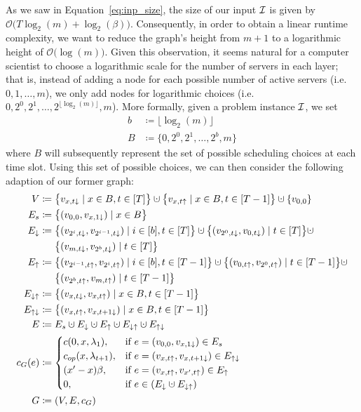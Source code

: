 As we saw in Equation~\eqref{eq:inp_size}, the size of our input $\mathcal{I}$ is given by $\mathcal{O}\bigl(T\log_2(m)+\log_2(\beta)\bigr)$. Consequently, in order to obtain a linear runtime complexity, we want to reduce the graph's height from $m+1$ to a logarithmic height of $\mathcal{O}\bigl(\log(m)\bigr)$. Given this observation, it seems natural for a computer scientist to choose a logarithmic scale for the number of servers in each layer; that is, instead of adding a node for each possible number of active servers (i.e.\ $0,1,\ldots,m$), we only add nodes for logarithmic choices (i.e.\ $0,2^0,2^1,\ldots,2^{\lfloor\log_2(m)\rfloor},m$). More formally, given a problem instance $\mathcal{I}$, we set
\begin{align*}
	b&\coloneqq\lfloor\log_2(m)\rfloor\\
	B&\coloneqq\{0,2^0,2^1,\ldots,2^b,m\}
\end{align*}
where $B$ will subsequently represent the set of possible scheduling choices at each time slot. Using this set of possible choices, we can then consider the following adaption of our former graph:
\begin{align*}
	V&\coloneqq\bigl\{v_{x,t\downarrow}\mid x\in B,t\in[T]\bigr\}\dotcup\bigl\{v_{x,t\uparrow}\mid x\in B, t\in[T-1]\bigr\}\dotcup\{v_{0,0}\}\\
	E_s&\coloneqq\bigl\{(v_{0,0},v_{x,1\downarrow})\mid x\in B\bigr\}\\
	E_\downarrow&\coloneqq\bigl\{(v_{2^i,t\downarrow},v_{2^{i-1},t\downarrow})\mid i\in[b],t\in[T]\bigr\}\dotcup\bigl\{(v_{2^0,t\downarrow},v_{0,t\downarrow})\mid t\in[T]\bigr\}\dotcup\\
	&\phantom{{}\coloneqq{}}\bigl\{(v_{m,t\downarrow},v_{2^b,t\downarrow})\mid t\in[T]\bigr\}\\
	E_\uparrow&\coloneqq\bigl\{(v_{2^{i-1},t\uparrow},v_{2^i,t\uparrow})\mid i\in[b],t\in[T-1]\bigr\}\dotcup\bigl\{(v_{0,t\uparrow},v_{2^0,t\uparrow})\mid t\in[T-1]\bigr\}\dotcup\\
	&\phantom{{}\coloneqq{}}\bigl\{(v_{2^b,t\uparrow},v_{m,t\uparrow})\mid t\in[T-1]\bigr\}\\
	E_{\downarrow\uparrow}&\coloneqq\bigl\{(v_{x,t\downarrow},v_{x,t\uparrow})\mid x\in B,t\in[T-1]\bigr\}\\
	E_{\uparrow\downarrow}&\coloneqq\bigl\{(v_{x,t\uparrow},v_{x,t+1\downarrow})\mid x\in B,t\in[T-1]\bigr\}\\
	E&\coloneqq E_s\dotcup E_\downarrow\dotcup E_\uparrow\dotcup E_{\downarrow\uparrow}\dotcup E_{\uparrow\downarrow}\\
	c_G(e)&\coloneqq
	\begin{cases}
		\costs(0,x,\lambda_1), & \text{if $e=(v_{0,0},v_{x,1\downarrow})\in E_s$}\\
		\opcosts(x,\lambda_{t+1}), & \text{if $e=(v_{x,t\uparrow},v_{x,t+1\downarrow})\in E_{\uparrow\downarrow}$}\\
		(x'-x)\beta, & \text{if $e=(v_{x,t\uparrow},v_{x',t\uparrow})\in E_\uparrow$}\\
		0, & \text{if $e\in(E_\downarrow\dotcup E_{\downarrow\uparrow})$}
	\end{cases}\\
	G&\coloneqq(V,E,c_G)
\end{align*}
